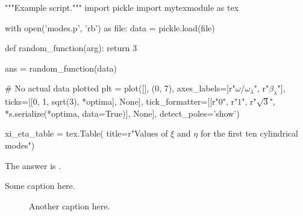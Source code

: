 \documentclass{article}
\begin{document}
\begin{sagesilent}
"""Example script."""
import pickle
import mytexmodule as tex

with open('modes.p', 'rb') as file:
    data = pickle.load(file)

def random_function(arg):
    return 3

ans = random_function(data)

# No actual data plotted
plt = plot([], (0, 7),
           axes_labels=[r"$\omega/\omega_\lambda$",
                        r"$\beta_\lambda$"],
           ticks=[[0, 1, sqrt(3), *optima], None],
           tick_formatter=[[r"$0$", r"$1$", r"$\sqrt{3}$",
                            *s.serialize(*optima, data=True)], None],
           detect_poles='show')

xi_eta_table = tex.Table(
    title=r"Values of $\xi$ and $\eta$ for the first ten cylindrical modes")
\end{sagesilent}

The answer is .

\begin{table}[ht]
  \centering
  \caption{Some caption here.}
  \label{plot1}
\end{table}

\begin{figure}[ht]
  \centering
  \caption{Another caption here.}
  \label{plot2}
\end{figure}
\end{document}
